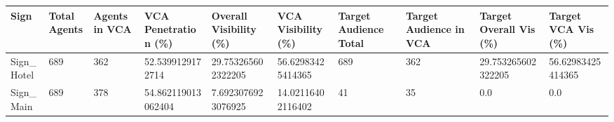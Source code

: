 \begin{tabular}{llllllllll}
\hline
Sign & Total Agents & Agents in VCA & VCA Penetration (\%) & Overall Visibility (\%) & VCA Visibility (\%) & Target Audience Total & Target Audience in VCA & Target Overall Vis (\%) & Target VCA Vis (\%) \\ \hline
Sign\_Hotel & 689 & 362 & 52.5399129172714 & 29.753265602322205 & 56.62983425414365 & 689 & 362 & 29.753265602322205 & 56.62983425414365 \\
Sign\_Main & 689 & 378 & 54.862119013062404 & 7.6923076923076925 & 14.02116402116402 & 41 & 35 & 0.0 & 0.0 \\
\hline
\end{tabular}
